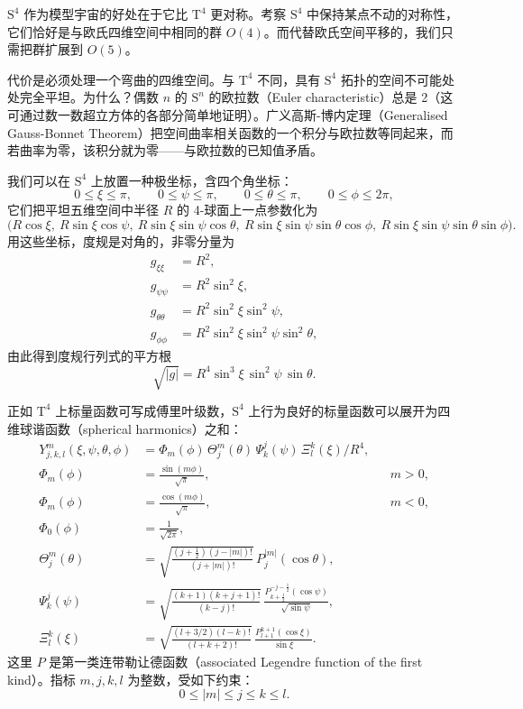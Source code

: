 $\text{S}^{4}$ 作为模型宇宙的好处在于它比 $\text{T}^{4}$ 更对称。考察 $\text{S}^{4}$ 中保持某点不动的对称性，它们恰好是与欧氏四维空间中相同的群 $O(4)$。而代替欧氏空间平移的，我们只需把群扩展到 $O(5)$。

代价是必须处理一个弯曲的四维空间。与 $\text{T}^{4}$ 不同，具有 $\text{S}^{4}$ 拓扑的空间不可能处处完全平坦。为什么？偶数 $n$ 的 $\text{S}^{n}$ 的欧拉数（Euler characteristic）总是 2（这可通过数一数超立方体的各部分简单地证明）。广义高斯-博内定理（Generalised Gauss-Bonnet Theorem）把空间曲率相关函数的一个积分与欧拉数等同起来，而若曲率为零，该积分就为零——与欧拉数的已知值矛盾。

我们可以在 $\text{S}^{4}$ 上放置一种极坐标，含四个角坐标：
\begin{equation}
0\le\xi\le\pi,\qquad 0\le\psi\le\pi,\qquad 0\le\theta\le\pi,\qquad 0\le\phi\le2\pi,
\end{equation}
它们把平坦五维空间中半径 $R$ 的 4-球面上一点参数化为
\begin{equation}
\bigl(R\cos\xi,\ R\sin\xi\cos\psi,\ R\sin\xi\sin\psi\cos\theta,\ R\sin\xi\sin\psi\sin\theta\cos\phi,\ R\sin\xi\sin\psi\sin\theta\sin\phi\bigr).
\end{equation}
用这些坐标，度规是对角的，非零分量为
\begin{align}
g_{\xi\xi} &= R^{2},\\
g_{\psi\psi} &= R^{2}\sin^{2}\xi,\\
g_{\theta\theta} &= R^{2}\sin^{2}\xi\sin^{2}\psi,\\
g_{\phi\phi} &= R^{2}\sin^{2}\xi\sin^{2}\psi\sin^{2}\theta,
\end{align}
由此得到度规行列式的平方根
\begin{equation}
\sqrt{|g|} = R^{4}\sin^{3}\xi\,\sin^{2}\psi\,\sin\theta.
\end{equation}

正如 $\text{T}^{4}$ 上标量函数可写成傅里叶级数，$\text{S}^{4}$ 上行为良好的标量函数可以展开为四维球谐函数（spherical harmonics）之和：
\begin{align}
Y^{m}_{j,k,l}(\xi,\psi,\theta,\phi) &= \Phi_{m}(\phi)\,\Theta^{m}_{j}(\theta)\,\Psi^{j}_{k}(\psi)\,\Xi^{k}_{l}(\xi)\big/R^{4},\\
\Phi_{m}(\phi) &= \frac{\sin(m\phi)}{\sqrt\pi}, && m>0,\\
\Phi_{m}(\phi) &= \frac{\cos(m\phi)}{\sqrt\pi}, && m<0,\\
\Phi_{0}(\phi) &= \frac{1}{\sqrt{2\pi}},\\
\Theta^{m}_{j}(\theta) &= \sqrt{\frac{(j+\tfrac12)(j-|m|)!}{(j+|m|)!}}\,P^{|m|}_{j}(\cos\theta),\\
\Psi^{j}_{k}(\psi) &= \sqrt{\frac{(k+1)(k+j+1)!}{(k-j)!}}\,\frac{P^{-j-\frac12}_{k+\frac12}(\cos\psi)}{\sqrt{\sin\psi}},\\
\Xi^{k}_{l}(\xi) &= \sqrt{\frac{(l+3/2)(l-k)!}{(l+k+2)!}}\,\frac{P^{k+1}_{l+1}(\cos\xi)}{\sin\xi}.
\end{align}
这里 $P$ 是第一类连带勒让德函数（associated Legendre function of the first kind）。指标 $m,j,k,l$ 为整数，受如下约束：
\begin{equation}
0\le|m|\le j\le k\le l.
\end{equation}

